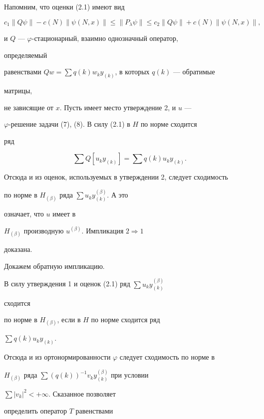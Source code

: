  


\begin{pf} 


Напомним, что оценки (2.1) имеют вид 


$$ 


c_1\|Q\psi\|-c(N)\|\psi(N,x)\|\le\|P_\lambda\psi\|\le c_2 


\|Q\psi\|+c(N)\|\psi(N,x)\|, 


$$ 


и $Q$ --- $\varphi$-стационарный, взаимно однозначный оператор, 


определяемый 


равенствами $Qw=\sum{}q(k)w_k y_{(k)}$, в которых $q(k)$ --- обратимые 


матрицы, 


не зависящие от $x$. Пусть имеет место утверждение 2, и $u$ --- 


$\varphi$-решение задачи (7), (8). В силу (2.1) в $H$ по норме сходится 


ряд 


$$ 


\sum Q[u_k y_{(k)}]=\sum q(k)u_k y_{(k)}. 


$$ 


Отсюда и из оценок, используемых в утверждении 2, следует сходимость 


по норме в $H_{(\beta)}$ ряда $\sum u_k y^{(\beta)}_{(k)}$. А это 


означает, что $u$ имеет в 


$H_{(\beta)}$ производную $u^{(\beta)}$. Импликация $2\Rightarrow 1$ 


доказана.


 


Докажем обратную импликацию. 


В силу утверждения 1 и оценок (2.1) ряд $\sum u_k y^{(\beta)}_{(k)}$ 


сходится 


по норме в $H_{(\beta)}$, если в $H$ по норме сходится ряд 


$\sum q(k)u_k y_{(k)}$. 


Отсюда и из ортонормированности $\varphi$ следует сходимость по норме в 


$H_{(\beta)}$ ряда $\sum(q(k))^{-1}v_k y^{(\beta)}_{(k)}$ при условии 


$\sum|v_k|^2<+\infty$. Сказанное позволяет 


определить оператор $T$ равенствами 


$$ 



\end{pf}

